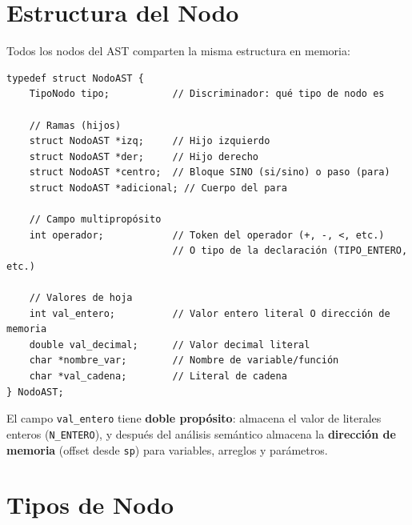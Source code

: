 \section{Estructura del Nodo}

Todos los nodos del AST comparten la misma estructura en memoria:

\begin{lstlisting}[style=cstyle, caption={Definición del nodo AST en ast.h}]
typedef struct NodoAST {
    TipoNodo tipo;           // Discriminador: qué tipo de nodo es

    // Ramas (hijos)
    struct NodoAST *izq;     // Hijo izquierdo
    struct NodoAST *der;     // Hijo derecho
    struct NodoAST *centro;  // Bloque SINO (si/sino) o paso (para)
    struct NodoAST *adicional; // Cuerpo del para

    // Campo multipropósito
    int operador;            // Token del operador (+, -, <, etc.)
                             // O tipo de la declaración (TIPO_ENTERO, etc.)

    // Valores de hoja
    int val_entero;          // Valor entero literal O dirección de memoria
    double val_decimal;      // Valor decimal literal
    char *nombre_var;        // Nombre de variable/función
    char *val_cadena;        // Literal de cadena
} NodoAST;
\end{lstlisting}

\begin{notebox}
El campo \texttt{val\_entero} tiene \textbf{doble propósito}: almacena el valor de literales enteros (\texttt{N\_ENTERO}), y después del análisis semántico almacena la \textbf{dirección de memoria} (offset desde \texttt{sp}) para variables, arreglos y parámetros.
\end{notebox}

\section{Tipos de Nodo}

